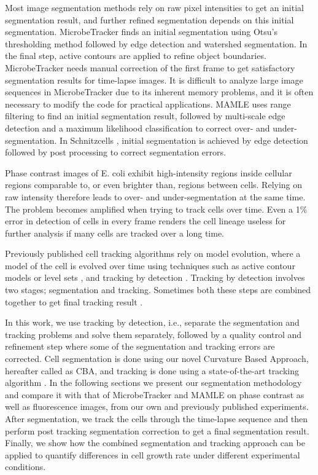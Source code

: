 \documentclass[journal]{IEEEtran}
\begin{document}
Most image segmentation methods rely on raw pixel intensities to get an initial segmentation result, and further refined segmentation depends on this initial segmentation. MicrobeTracker \cite {sliusarenkohigh2011} finds an initial segmentation using Otsu’s thresholding method \cite {otsuthreshold1979} followed by edge detection and watershed segmentation. In the final step, active contours are applied to refine object boundaries. MicrobeTracker needs manual correction of the first frame to get satisfactory segmentation results for time-lapse images. It is difficult to analyze large image sequences in MicrobeTracker due to its inherent memory problems, and it is often necessary to modify the code for practical applications. MAMLE \cite {chowdhurycell2013} uses range filtering to find an initial segmentation result, followed by multi-scale edge detection and a maximum likelihood classification to correct over- and under- segmentation. In Schnitzcells \cite {youngmeasuring2012}, initial segmentation is achieved by edge detection followed by post processing to correct segmentation errors. 

Phase contrast images of E. coli exhibit high-intensity regions inside cellular regions comparable to, or even brighter than, regions between cells. Relying on raw intensity therefore leads to over- and under-segmentation at the same time. The problem becomes amplified when trying to track cells over time. Even a 1\% error in detection of cells in every frame renders the cell lineage useless for further analysis if many cells are tracked over a long time.

Previously published cell tracking algorithms rely on model evolution, where a model of the cell is evolved over time using techniques such as active contour models \cite {zimmersegmentation2002} or level sets \cite {dzyubachykadvanced2010}, and tracking by detection \cite {bisereliable2011}. Tracking by detection involves two stages; segmentation and tracking. Sometimes both these steps are combined together to get final tracking result \cite {jugoptimal2014}. 

In this work, we use tracking by detection, i.e., separate the segmentation and tracking problems and solve them separately, followed by a quality control and refinement step where some of the segmentation and tracking errors are corrected. Cell segmentation is done using our novel Curvature Based Approach, hereafter called as CBA, and tracking is done using a state-of-the-art tracking algorithm \cite {magnussonglobal2014}. In the following sections we present our segmentation methodology and compare it with that of MicrobeTracker and MAMLE on phase contrast as well as fluorescence images, from our own and previously published experiments. After segmentation, we track the cells through the time-lapse sequence and then perform post tracking segmentation correction to get a final segmentation result. Finally, we show how the combined segmentation and tracking approach can be applied to quantify differences in cell growth rate under different experimental conditions.
\end{document}
